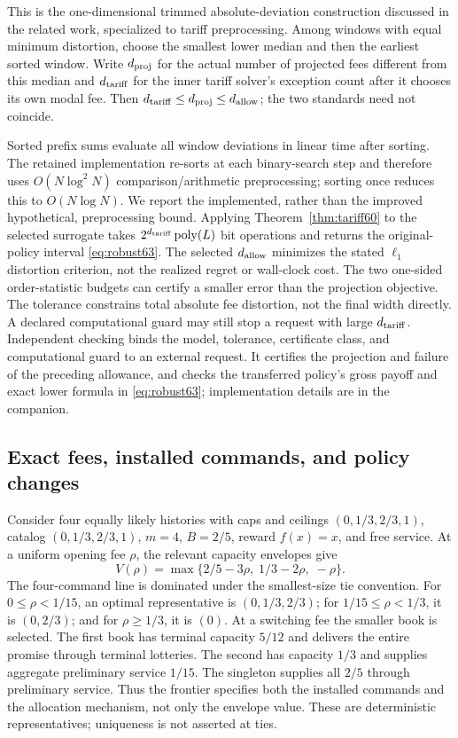 \documentclass[11pt,letterpaper]{article}
\theoremstyle{definition}\newtheorem{remark}[theorem]{Remark}
\begin{document}
This is the one-dimensional trimmed absolute-deviation construction discussed in the related work, specialized to tariff preprocessing. Among windows with equal minimum distortion, choose the smallest lower median and then the earliest sorted window. Write $d_{\rm proj}$ for the actual number of projected fees different from this median and $d_{\rm tariff}$ for the inner tariff solver's exception count after it chooses its own modal fee. Then $d_{\rm tariff}\leq d_{\rm proj}\leq d_{\rm allow}$; the two standards need not coincide.

Sorted prefix sums evaluate all window deviations in linear time after sorting. The retained implementation re-sorts at each binary-search step and therefore uses $O(N\log^2 N)$ comparison/arithmetic preprocessing; sorting once reduces this to $O(N\log N)$. We report the implemented, rather than the improved hypothetical, preprocessing bound. Applying Theorem~\ref{thm:tariff60} to the selected surrogate takes $2^{d_{\rm tariff}}\operatorname{poly}(L)$ bit operations and returns the original-policy interval \eqref{eq:robust63}. The selected $d_{\rm allow}$ minimizes the stated $\ell_1$ distortion criterion, not the realized regret or wall-clock cost. The two one-sided order-statistic budgets can certify a smaller error than the projection objective. The tolerance constrains total absolute fee distortion, not the final width directly. A declared computational guard may still stop a request with large $d_{\rm tariff}$. Independent checking binds the model, tolerance, certificate class, and computational guard to an external request. It certifies the projection and failure of the preceding allowance, and checks the transferred policy's gross payoff and exact lower formula in \eqref{eq:robust63}; implementation details are in the companion.

\subsection{Exact fees, installed commands, and policy changes}\label{sec:frontier63}
Consider four equally likely histories with caps and ceilings $(0,1/3,2/3,1)$, catalog $(0,1/3,2/3,1)$, $m=4$, $B=2/5$, reward $f(x)=x$, and free service. At a uniform opening fee $\rho$, the relevant capacity envelopes give
\[
 V(\rho)=\max\{2/5-3\rho,\;1/3-2\rho,\;-\rho\}.
\]
The four-command line is dominated under the smallest-size tie convention. For $0\leq\rho<1/15$, an optimal representative is $(0,1/3,2/3)$; for $1/15\leq\rho<1/3$, it is $(0,2/3)$; and for $\rho\geq1/3$, it is $(0)$. At a switching fee the smaller book is selected. The first book has terminal capacity $5/12$ and delivers the entire promise through terminal lotteries. The second has capacity $1/3$ and supplies aggregate preliminary service $1/15$. The singleton supplies all $2/5$ through preliminary service. Thus the frontier specifies both the installed commands and the allocation mechanism, not only the envelope value. These are deterministic representatives; uniqueness is not asserted at ties.
\end{document}
